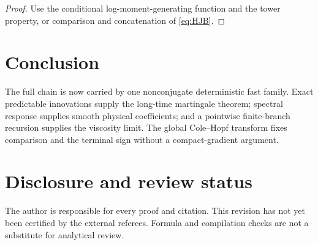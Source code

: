 \documentclass[11pt,reqno]{amsart}
\theoremstyle{definition}
\theoremstyle{remark}
\begin{document}
\begin{proof}
Use the conditional log-moment-generating function and the tower property, or
comparison and concatenation of \eqref{eq:HJB}.
\end{proof}

\section{Conclusion}

The full chain is now carried by one nonconjugate deterministic fast family.
Exact predictable innovations supply the long-time martingale theorem;
spectral response supplies smooth physical coefficients; and a pointwise
finite-branch recursion supplies the viscosity limit.  The global Cole--Hopf
transform fixes comparison and the terminal sign without a compact-gradient
argument.

\section*{Disclosure and review status}
The author is responsible for every proof and citation.  This revision has not
yet been certified by the external referees.  Formula and compilation checks
are not a substitute for analytical review.



\end{document}
